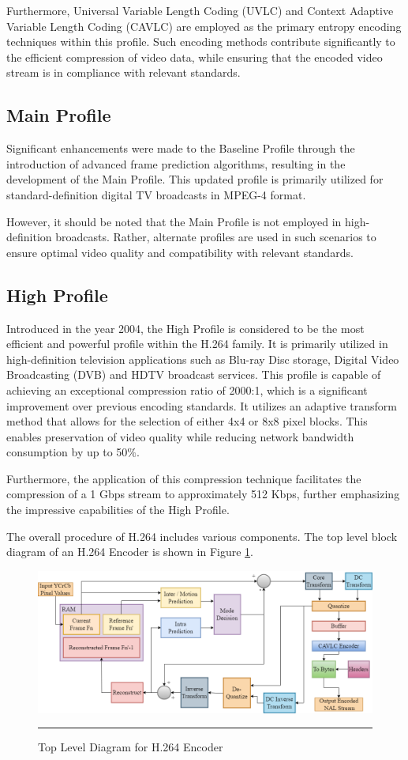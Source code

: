 Furthermore, Universal Variable Length Coding (UVLC) and Context Adaptive Variable Length Coding (CAVLC) are employed as the primary entropy encoding techniques within this profile. Such encoding methods contribute significantly to the efficient compression of video data, while ensuring that the encoded video stream is in compliance with relevant standards. 

\subsection{Main Profile}
Significant enhancements were made to the Baseline Profile through the introduction of advanced frame prediction algorithms, resulting in the development of the Main Profile. This updated profile is primarily utilized for standard-definition digital TV broadcasts in MPEG-4 format.

However, it should be noted that the Main Profile is not employed in high-definition broadcasts. Rather, alternate profiles are used in such scenarios to ensure optimal video quality and compatibility with relevant standards.

\subsection{High Profile}
Introduced in the year 2004, the High Profile is considered to be the most efficient and powerful profile within the H.264 family. It is primarily utilized in high-definition television applications such as Blu-ray Disc storage, Digital Video Broadcasting (DVB) and HDTV broadcast services. This profile is capable of achieving an exceptional compression ratio of 2000:1, which is a significant improvement over previous encoding standards. It utilizes an adaptive transform method that allows for the selection of either 4x4 or 8x8 pixel blocks. This enables preservation of video quality while reducing network bandwidth consumption by up to 50$\%$.

Furthermore, the application of this compression technique facilitates the compression of a 1 Gbps stream to approximately 512 Kbps, further emphasizing the impressive capabilities of the High Profile.

The overall procedure of H.264 includes various components. The top level block diagram of an H.264 Encoder is shown in Figure \ref{fig:toplevel}.

\begin{figure}[htbp]
	\centering
	\includegraphics[width = 5in]{./Figures/toplevel.png}
	\rule{35em}{0.5pt}
	\caption{Top Level Diagram for H.264 Encoder}
	\label{fig:toplevel}
\end{figure}

